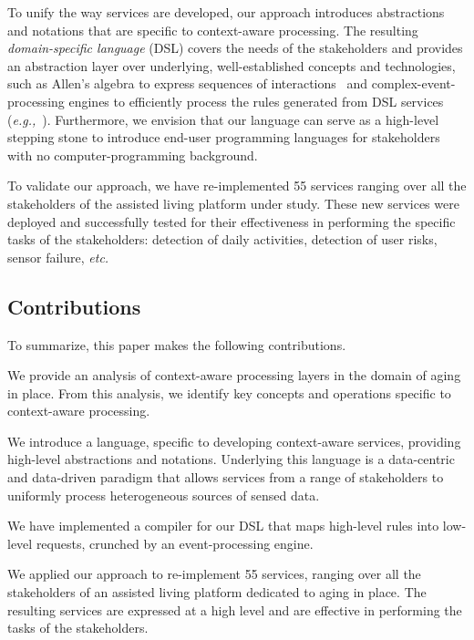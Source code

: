 To unify the way services are developed, our approach introduces abstractions and notations that are specific to context-aware processing. The resulting {\em domain-specific language} (DSL) covers the needs of the stakeholders and provides an abstraction layer over underlying, well-established concepts and technologies, such as Allen's algebra to express sequences of interactions~\cite{Allen} and complex-event-processing engines to efficiently process the rules generated from DSL services ({\em e.g.,}~\cite{Cugola:2012:PFI:2187671.2187677}). Furthermore, we envision that our language can serve as a high-level stepping stone to introduce end-user programming languages for stakeholders with no computer-programming background.

To validate our approach, we have re-implemented 55 services ranging over all the stakeholders of the assisted living platform under study. These new services were deployed and successfully tested for their effectiveness in performing the specific tasks of the stakeholders: detection of daily activities, detection of user risks, sensor failure, {\em etc.}

\subsection*{Contributions}
To summarize, this paper makes the following contributions.

 We provide an analysis of context-aware processing layers in the domain of aging in place. From this analysis, we identify key concepts and operations specific to context-aware processing.

 We introduce a language, specific to developing context-aware services, providing high-level abstractions and notations. 
Underlying this language is a data-centric and data-driven paradigm that allows services from a range of stakeholders to uniformly process heterogeneous sources of sensed data.

 We have implemented a compiler for our DSL that maps high-level rules into low-level requests, crunched by an event-processing engine.

 We applied our approach to re-implement 55 services, ranging over all the stakeholders of an assisted living platform dedicated to aging in place. The resulting services are expressed at a high level and are effective in performing the tasks of the stakeholders.





